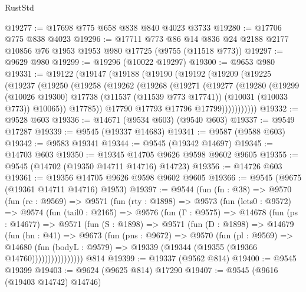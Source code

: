 \begin{lexlean}{RustStd}
\begin{coremodule}
@19277 := @17698 @775 @658 @838 @840 @4023 @3733
@19280 := @17706 @775 @838 @4023
@19296 := @17711
    @773
    @86
    @14
    @836
    @24
    @2188
    @2177
    @10856
    @76
    @1953
    @1953
    @980
    @17725
    (@9755 (@11518 @773))
@19297 := @9629 @980
@19299 := @19296 (@10022 @19297)
@19300 := @9653 @980
@19331 := @19122
    (@19147
      (@19188
        (@19190
          (@19192
            (@19209
              (@19225
                (@19237
                  (@19250
                    (@19258
                      (@19262
                        (@19268
                          (@19271
                            (@19277
                              (@19280
                                (@19299
                                  (@10026 @19300)
                                  @17738
                                  (@11537 (@11539 @773 @17741))
                                  (@10031 (@10033 @773))
                                  @10065))
                              @17785))
                          @17790
                          @17793
                          @17796
                          @17799)))))))))))
@19332 := @9528 @603
@19336 := @14671 (@9534 @603) (@9540 @603)
@19337 := @9549 @17287
@19339 := @9545 (@19337 @14683)
@19341 := @9587 (@9588 @603)
@19342 := @9583 @19341
@19344 := @9545 (@19342 @14697)
@19345 := @14703 @603
@19350 := @19345 @14705 @9626 @9598 @9602 @9605
@19355 := @9545 (@14702 (@19350 @14711 @14716) @14723)
@19356 := @14726 @603
@19361 := @19356 @14705 @9626 @9598 @9602 @9605
@19366 := @9545 (@9675 (@19361 @14711 @14716) @1953)
@19397 := @9544
    (fun (fn : @38) =>
    @9570
      (fun (rc : @9569) =>
      @9571
        (fun (rty : @1898) =>
        @9573
          (fun (lets0 : @9572) =>
          @9574
            (fun (tail0 : @2165) =>
            @9576
              (fun (Γ : @9575) =>
              @14678
                (fun (ps : @14677) =>
                @9571
                  (fun (S : @1898) =>
                  @9571
                    (fun (D : @1898) =>
                    @14679
                      (fun (hn : @41) =>
                      @9673
                        (fun (pns : @9672) =>
                        @9570
                          (fun (pl : @9569) =>
                          @14680
                            (fun (bodyL : @9579) =>
                            @19339 (@19344 (@19355 (@19366 @14760))))))))))))))))
    @814
@19399 := @19337 (@9562 @814)
@19400 := @9545 @19399
@19403 := @9624 (@9625 @814) @17290
@19407 := @9545 (@9616 (@19403 @14742) @14746)

\end{coremodule}
\end{lexlean}
